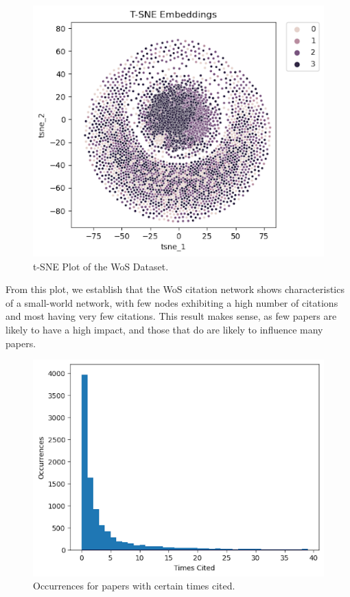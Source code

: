 \documentclass[conference]{IEEEtran}
\begin{document}
\begin{figure}[htbp]
    \centerline{\includegraphics[scale=0.3] {tsne_embeddings.png}}
    \caption{t-SNE Plot of the WoS Dataset.}
    \label{fig}
\end{figure}

From this plot, we establish that the WoS citation network shows 
characteristics of a small-world network, with few nodes exhibiting 
a high number of citations and most having very few citations. 
This result makes sense, as few papers are likely to have a high 
impact, and those that do are likely to influence many papers. \par

\begin{figure}[htbp]
    \centerline{\includegraphics[scale=0.3] {times_cited.png}}
    \caption{Occurrences for papers with certain times cited.}
    \label{fig}
\end{figure}
\end{document}
